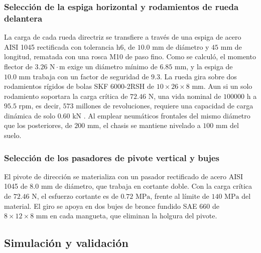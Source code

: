 \documentclass[../../General.tex]{subfiles}
\begin{document}
\subsubsection{Selección de la espiga horizontal y rodamientos de rueda delantera}
La carga de cada rueda directriz se transfiere a través de una espiga de acero AISI 1045 rectificada con tolerancia h6, de $10.0\text{ mm}$ de diámetro y $45\text{ mm}$ de longitud, rematada con una rosca M10 de paso fino. Como se calculó, el momento flector de $3.26\text{ N}\cdot\text{m}$ exige un diámetro mínimo de $6.85\text{ mm}$, y la espiga de $10.0\text{ mm}$ trabaja con un factor de seguridad de $9.3$. La rueda gira sobre dos rodamientos rígidos de bolas SKF 6000-2RSH de $10 \times 26 \times 8\text{ mm}$. Aun si un solo rodamiento soportara la carga crítica de $72.46\text{ N}$, una vida nominal de $100000\text{ h}$ a $95.5\text{ rpm}$, es decir, $573$ millones de revoluciones, requiere una capacidad de carga dinámica de solo $0.60\text{ kN}$ \citep{iso281_2007}. Al emplear neumáticos frontales del mismo diámetro que los posteriores, de $200\text{ mm}$, el chasis se mantiene nivelado a $100\text{ mm}$ del suelo.

\subsubsection{Selección de los pasadores de pivote vertical y bujes}
El pivote de dirección se materializa con un pasador rectificado de acero AISI 1045 de $8.0\text{ mm}$ de diámetro, que trabaja en cortante doble. Con la carga crítica de $72.46\text{ N}$, el esfuerzo cortante es de $0.72\text{ MPa}$, frente al límite de $140\text{ MPa}$ del material. El giro se apoya en dos bujes de bronce fundido SAE 660 de $8 \times 12 \times 8\text{ mm}$ en cada mangueta, que eliminan la holgura del pivote.

\subsection{Simulación y validación}
\end{document}

